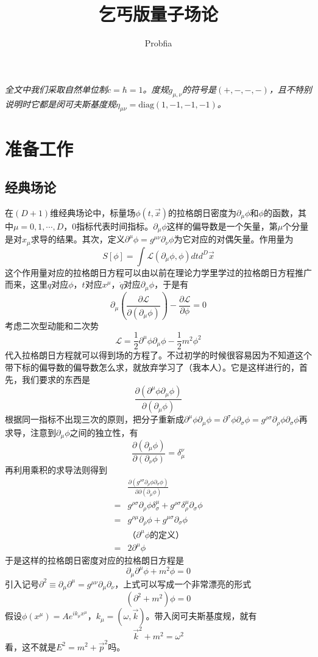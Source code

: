 \documentclass[a4paper,11pt]{ctexart}
\title{乞丐版量子场论}
\author{Probfia}
\date{}
\newcommand{\beq}{\begin{equation}}
\newcommand{\eeq}{\end{equation}}
\newcommand{\bea}{\begin{equation}\begin{aligned}}
\newcommand{\eea}{\end{aligned}\end{equation}}
\newcommand{\lagden}{\mathcal{L}}
\newcommand{\diag}{\mathrm{diag}}
\begin{document}
\maketitle
\tableofcontents
\vspace{5mm}
\emph{
全文中我们采取自然单位制$c = \hbar = 1$。度规$g_{\mu,\nu}$的符号是$(+,-,-,-)$，且不特别说明时它都是闵可夫斯基度规$\eta_{\mu \nu} = \diag (1,-1,-1,-1)$。
}
\section{准备工作}
\subsection{经典场论}
在$(D+1)$维经典场论中，标量场$\phi(t,\vec{x})$的拉格朗日密度为$\partial_\mu \phi$和$\phi$的函数，其中$\mu = 0,1,\cdots,D$，0指标代表时间指标。$\partial_\mu \phi$这样的偏导数是一个矢量，第$\mu$个分量是对$x_\mu$求导的结果。其次，定义$\partial^\mu \phi = g^{\mu \nu} \partial_\nu \phi$为它对应的对偶矢量。作用量为
\beq
S[\phi] = \int  \lagden(\partial_\mu \phi,\phi)dt d^D\vec{x}
\eeq
这个作用量对应的拉格朗日方程可以由以前在理论力学里学过的拉格朗日方程推广而来，这里$q$对应$\phi$，$t$对应$x^\mu$，$\dot{q}$对应$\partial_\mu \phi$，于是有
\beq
\partial_\mu (\frac{\partial \lagden}{\partial (\partial_\mu \phi)}) - \frac{\partial \lagden}{\partial \phi} = 0
\eeq
考虑二次型动能和二次势
\beq
\lagden = \frac{1}{2} \partial^\mu \phi \partial_\mu \phi - \frac{1}{2}m^2 \phi^2
\eeq
代入拉格朗日方程就可以得到场的方程了。不过初学的时候很容易因为不知道这个带下标的偏导数的偏导数怎么求，就放弃学习了（我本人）。它是这样进行的，首先，我们要求的东西是
\beq
\frac{\partial (\partial^\mu \phi \partial_\mu \phi)}{\partial (\partial_\mu \phi)}
\eeq
根据同一指标不出现三次的原则，把分子重新成$\partial^\mu \phi \partial_\mu \phi = \partial^\sigma \phi \partial_\sigma \phi = g^{\rho \sigma} \partial_\rho \phi \partial_\sigma \phi$再求导，注意到$\partial_\mu \phi$之间的独立性，有
\beq
\frac{\partial (\partial_\mu \phi )}{\partial (\partial_\nu \phi )} = \delta^\nu_\mu
\eeq
再利用乘积的求导法则得到
\bea
&\frac{\partial (g^{\rho \sigma} \partial_\rho \phi \partial_\sigma \phi)}{\partial \partial(\partial_\mu \phi)} \\
= &g^{\rho \sigma} \partial_\rho \phi \delta^\mu_\sigma + g^{\rho \sigma} \delta^\mu_\rho \partial_\sigma \phi \\
= &g^{\rho \mu}\partial_\rho \phi+ g^{\mu \sigma}\partial_\sigma \phi \\
  &\text{（$\partial^\mu \phi$的定义）} \\
= & 2\partial^\mu \phi
\eea
于是这样的拉格朗日密度对应的拉格朗日方程是
\beq
\partial_\mu \partial^\mu \phi + m^2 \phi = 0
\eeq
引入记号$\partial^2 \equiv \partial_\mu \partial^\mu = g^{\mu \nu} \partial_\mu \partial_\nu$，上式可以写成一个非常漂亮的形式
\beq
(\partial^2 + m^2) \phi = 0
\eeq
假设$\phi(x^\mu) = Ae^{i k_\mu x^\mu}$，$k_\mu = (\omega,\vec{k})$。带入闵可夫斯基度规，就有
\beq
\vec{k}^2 + m^2 = \omega^2
\eeq
看，这不就是$E^2 = m^2 + \vec{p}^2$吗。
\end{document}
